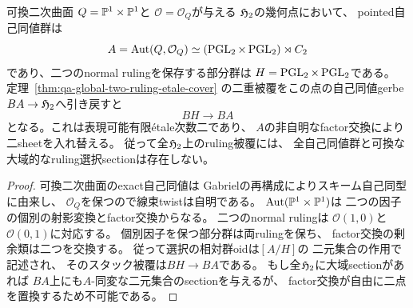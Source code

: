 \begin{corollary}[可換二次曲面の自己同値群における二重被覆の非自明性]
\label{cor:qa-ruling-cover-nontrivial-commutative-gerbe}
可換二次曲面
$Q=\mathbb P^1\times\mathbb P^1$と
$\mathcal O=\mathcal O_Q$が与える
$\mathfrak H_2$の幾何点において、
pointed自己同値群は
\[
 A=\operatorname{Aut}(Q,\mathcal O_Q)
   \simeq(\operatorname{PGL}_2\times\operatorname{PGL}_2)\rtimes C_2
\]
であり、二つのnormal rulingを保存する部分群は
$H=\operatorname{PGL}_2\times\operatorname{PGL}_2$である。
定理~\ref{thm:qa-global-two-ruling-etale-cover}
の二重被覆をこの点の自己同値gerbe
$BA\to\mathfrak H_2$へ引き戻すと
\[
 BH\longrightarrow BA
\]
となる。これは表現可能有限étale次数二であり、
$A$の非自明なfactor交換により二sheetを入れ替える。
従って全$\mathfrak H_2$上のruling被覆には、
全自己同値群と可換な大域的なruling選択sectionは存在しない。
\end{corollary}
\begin{proof}
可換二次曲面のexact自己同値は
Gabrielの再構成によりスキーム自己同型に由来し、
$\mathcal O_Q$を保つので線束twistは自明である。
$\operatorname{Aut}(\mathbb P^1\times\mathbb P^1)$は
二つの因子の個別の射影変換とfactor交換からなる。
二つのnormal rulingは
$\mathcal O(1,0)$と$\mathcal O(0,1)$に対応する。
個別因子を保つ部分群は両rulingを保ち、
factor交換の剰余類は二つを交換する。
従って選択の相対群oidは$[A/H]$の
二元集合の作用で記述され、
そのスタック被覆は$BH\to BA$である。
もし全$\mathfrak H_2$に大域sectionがあれば
$BA$上にも$A$-同変な二元集合のsectionを与えるが、
factor交換が自由に二点を置換するため不可能である。
\end{proof}

